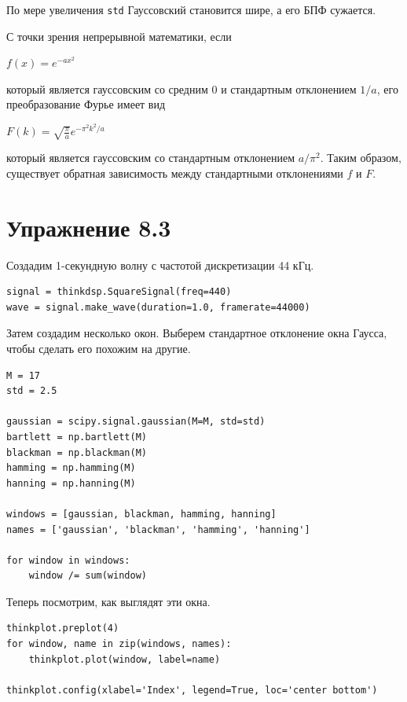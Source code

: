 \documentclass[a4paper,12pt]{report}
\begin{document}
По мере увеличения \texttt{std} Гауссовский становится шире, а его БПФ сужается.

С точки зрения непрерывной математики, если

$f(x) = e^{-a x^2}$

который является гауссовским со средним 0 и стандартным отклонением $1/a$, его преобразование Фурье имеет вид

$F(k) = \sqrt{\frac{\pi}{a}} e^{-\pi^2 k^2/a}$

который является гауссовским со стандартным отклонением $a / \pi^2$. Таким образом, существует обратная зависимость между стандартными отклонениями $f$ и $F$.

\chapter{Упражнение 8.3}

Создадим 1-секундную волну с частотой дискретизации 44 кГц.

\begin{lstlisting}[caption=Создание сигнала]
signal = thinkdsp.SquareSignal(freq=440)
wave = signal.make_wave(duration=1.0, framerate=44000)
\end{lstlisting}

Затем создадим несколько окон. Выберем стандартное отклонение окна Гаусса, чтобы сделать его похожим на другие.

\begin{lstlisting}[caption=Создание различных окон]
M = 17
std = 2.5

gaussian = scipy.signal.gaussian(M=M, std=std)   
bartlett = np.bartlett(M)
blackman = np.blackman(M)
hamming = np.hamming(M)
hanning = np.hanning(M)

windows = [gaussian, blackman, hamming, hanning]
names = ['gaussian', 'blackman', 'hamming', 'hanning']

for window in windows:
    window /= sum(window)
\end{lstlisting}

Теперь посмотрим, как выглядят эти окна.

\begin{lstlisting}[caption=Визуализация окон]
thinkplot.preplot(4)
for window, name in zip(windows, names):
    thinkplot.plot(window, label=name)

thinkplot.config(xlabel='Index', legend=True, loc='center bottom')
\end{lstlisting}
\end{document}
